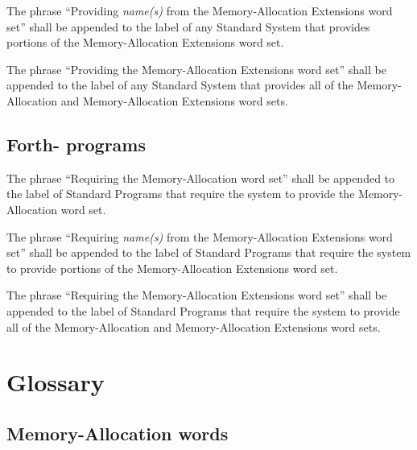 The phrase ``Providing \emph{name(s)} from the Memory-Allocation
Extensions word set'' shall be appended to the label of any Standard
System that provides portions of the Memory-Allocation Extensions
word set.

The phrase ``Providing the Memory-Allocation Extensions word set''
shall be appended to the label of any Standard System that provides
all of the Memory-Allocation and Memory-Allocation Extensions word
sets.

\subsection{Forth-\snapshot{} programs} %

The phrase ``Requiring the Memory-Allocation word set'' shall be
appended to the label of Standard Programs that require the system
to provide the Memory-Allocation word set.

The phrase ``Requiring \emph{name(s)} from the Memory-Allocation
Extensions word set'' shall be appended to the label of Standard
Programs that require the system to provide portions of the
Memory-Allocation Extensions word set.

The phrase ``Requiring the Memory-Allocation Extensions word set''
shall be appended to the label of Standard Programs that require
the system to provide all of the Memory-Allocation and
Memory-Al\-lo\-ca\-tion Extensions word sets.


\section{Glossary} %
\subsection{Memory-Allocation words} %

